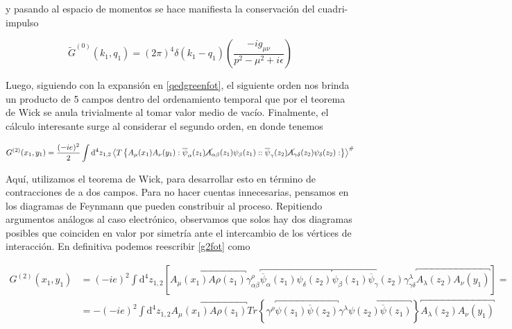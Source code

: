 \documentclass{article}
\numberwithin{equation}{section}
\begin{document}
y pasando al espacio de momentos se hace manifiesta la conservación del cuadri-impulso

\begin{equation}\label{key}
\widetilde{G}^{(0)}(k_1,q_1)=\left(2\pi\right)^4 \delta(k_1-q_1)\left(\frac{-ig_{\mu\nu}}{p^2 -\mu^2 +i\epsilon}\right)
\end{equation}

Luego, siguiendo con la expansión en \ref{qedgreenfot}, el siguiente orden nos brinda un producto de 5 campos dentro del ordenamiento temporal que por el teorema de Wick se anula trivialmente al tomar valor medio de vacío. Finalmente, el cálculo interesante surge al considerar el segundo orden, en donde tenemos

\begin{equation}\label{g2fot}
G^{(2)}(x_{1},y_{1})=\frac{(-ie)^{2}}{2}\int \mathrm{\mathrm{d^4}}z_{1,2}\left\langle T\left\{  A_{\mu}(x_{1})A_{\nu}(y_{1}):\overline{\psi}_{\alpha}(z_{1})\cancel{A}_{\alpha\beta}(z_{1})\psi_{\beta}(z_{1})::\overline{\psi}_{\gamma}(z_{2})\cancel{A}_{\gamma\delta}(z_{2})\psi_{\delta}(z_{2}):\right\} \right\rangle ^{\#}
\end{equation}

Aquí, utilizamos el teorema de Wick, para desarrollar esto en término de contracciones de a dos campos. Para no hacer cuentas innecesarias, pensamos en los diagramas de Feynmann que pueden constribuir al proceso. Repitiendo argumentos análogos al caso electrónico, observamos que solos hay dos diagramas posibles que coinciden en valor por simetría ante el intercambio de los vértices de interacción. En definitiva podemos reescribir \ref{g2fot} como

\begin{equation}\label{key}
\begin{aligned}
G^{(2)}(x_{1},y_{1})&=(-ie)^{2}\int \mathrm{\mathrm{d^4}}z_{1,2}\left[\overbracket{A_{\mu}(x_{1})A{\rho}(z_1)} \gamma^{\rho}_{\alpha\beta} \overbracket{\overline{\psi}_{\alpha}(z_1)\psi_{\delta}(z_{2})}\overbracket{\psi_{\beta}(z_{1})\overline{\psi}_{\gamma}(z_2)} \gamma^{\lambda}_{\gamma\delta}\overbracket{A_{\lambda}(z_2)A_{\nu}(y_1)}\right]=\\
&=-(-ie)^{2}\int \mathrm{\mathrm{d^4}}z_{1,2}\overbracket{A_{\mu}(x_{1})A{\rho}(z_1)} Tr\left\{ \gamma^{\rho} \overbracket{\psi(z_{1})\overline{\psi}(z_2)} \gamma^{\lambda}\overbracket{\psi(z_{2})\overline{\psi}(z_1)}\right\}\overbracket{A_{\lambda}(z_2)A_{\nu}(y_1)}
\end{aligned}
\end{equation}
\end{document}
